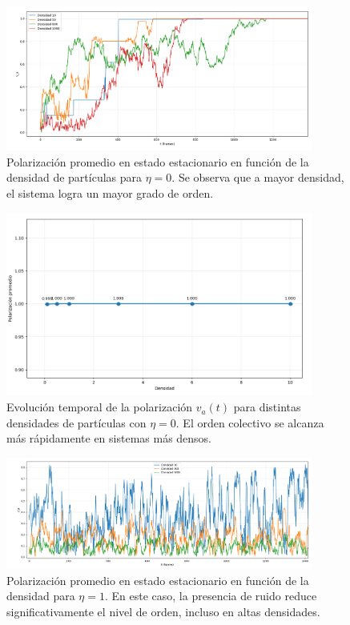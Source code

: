 \documentclass{article}
\begin{document}
\begin{figure}[H]
\centering
\includegraphics[width=0.9\textwidth]{Voter Ruido 0 variando densidad.png}
\caption{Polarización promedio en estado estacionario en función de la densidad de partículas para $\eta = 0$. Se observa que a mayor densidad, el sistema logra un mayor grado de orden.}
\label{fig:promedio_va_densidad_voter0}
\end{figure}

\begin{figure}[H]
\centering
\includegraphics[width=0.9\textwidth]{Voter Ruido 0 variando densidad avg.png}
\caption{Evolución temporal de la polarización $v_a(t)$ para distintas densidades de partículas con $\eta = 0$. El orden colectivo se alcanza más rápidamente en sistemas más densos.}
\label{fig:va_tiempo_densidad_voter0}
\end{figure}

\begin{figure}[H]
\centering
\includegraphics[width=0.9\textwidth]{Voter Ruido 1 variando densidad.png}
\caption{Polarización promedio en estado estacionario en función de la densidad para $\eta = 1$. En este caso, la presencia de ruido reduce significativamente el nivel de orden, incluso en altas densidades.}
\label{fig:promedio_va_densidad_voter1}
\end{figure}
\end{document}
